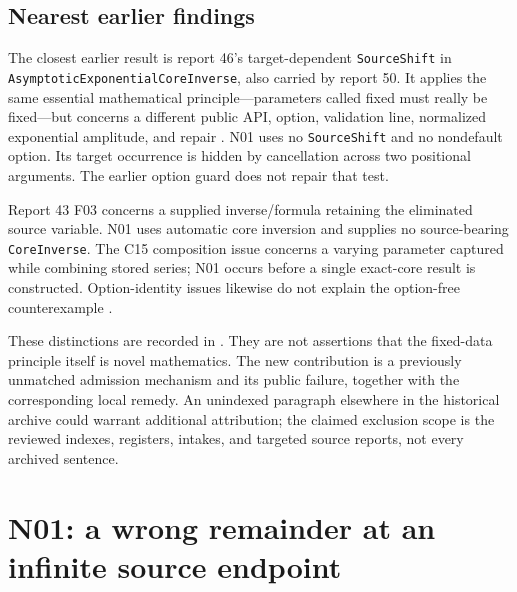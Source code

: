 \documentclass[11pt,letterpaper]{article}
\theoremstyle{remark}\newtheorem{remark}[theorem]{Remark}
\newcommand{\code}[1]{\texttt{#1}}
\newcommand{\file}[1]{\path{#1}}
\begin{document}
\subsection{Nearest earlier findings}
The closest earlier result is report 46's target-dependent
\code{SourceShift} in \code{Asymptotic\allowbreak Exponential\allowbreak CoreInverse}, also carried by
report 50. It applies the same essential mathematical principle---parameters
called fixed must really be fixed---but concerns a different public API,
option, validation line, normalized exponential amplitude, and repair
\cite{r46,wave6}. N01 uses no \code{SourceShift} and no nondefault option.
Its target occurrence is hidden by cancellation across two positional
arguments. The earlier option guard does not repair that test.

Report 43 F03 concerns a supplied inverse/formula retaining the eliminated
source variable. N01 uses automatic core inversion and supplies no
source-bearing \code{CoreInverse}. The C15 composition issue concerns a varying
parameter captured while combining stored series; N01 occurs before a single
exact-core result is constructed. Option-identity issues likewise do not
explain the option-free counterexample \cite{r43,register,wave3,wave6}.

These distinctions are recorded in \file{evidence/novelty-ledger.csv}. They are
not assertions that the fixed-data principle itself is novel mathematics.
The new contribution is a previously unmatched admission mechanism and its
public failure, together with the corresponding local remedy. An unindexed
paragraph elsewhere in the historical archive could warrant additional
attribution; the claimed exclusion scope is the reviewed indexes, registers,
intakes, and targeted source reports, not every archived sentence.

\section{N01: a wrong remainder at an infinite source endpoint}
\end{document}
